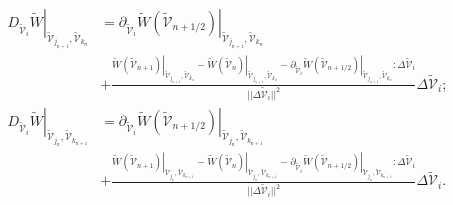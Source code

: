 \begin{equation}\label{eqn:definition of partitioned discrete gradient I}
\begin{aligned}
\left.D_{\widetilde{\mathcal{V}}_i}\widetilde{W}\right\vert_{\widetilde{\mathcal{V}}_{j_{n+1}},\widetilde{\mathcal{V}}_{k_{n}}}&  = \left.\partial_{\widetilde{\mathcal{V}}_i}\widetilde{W}\left(\widetilde{\mathcal{V}}_{n+1/2}\right)\right\vert_{\widetilde{\mathcal{V}}_{j_{n+1}},\widetilde{\mathcal{V}}_{k_{n}}}\\& + 
%
\frac{\left.\widetilde{W}\left(\widetilde{\mathcal{V}}_{n+1}\right)\right\vert_{\widetilde{\mathcal{V}}_{j_{n+1}},\widetilde{\mathcal{V}}_{k_{n}}} - 
	\left.\widetilde{W}\left(\widetilde{\mathcal{V}}_{n}\right)\right\vert_{\widetilde{\mathcal{V}}_{j_{n+1}},\widetilde{\mathcal{V}}_{k_{n}}}
	-\left.\partial_{\widetilde{\mathcal{V}}_i}\widetilde{W}\left(\widetilde{\mathcal{V}}_{n+1/2}\right)\right\vert_{\widetilde{\mathcal{V}}_{j_{n+1}},\widetilde{\mathcal{V}}_{k_{n}}}:\Delta\widetilde{\mathcal{V}}_i}{\vert\vert\Delta\widetilde{\mathcal{V}}_i\vert\vert^2}\Delta\widetilde{\mathcal{V}}_i;\\
%
%
\left.D_{\widetilde{\mathcal{V}}_i}\widetilde{W}\right\vert_{\widetilde{\mathcal{V}}_{j_{n}},\widetilde{\mathcal{V}}_{k_{n+1}}}&  = \left.\partial_{\widetilde{\mathcal{V}}_i}\widetilde{W}\left(\widetilde{\mathcal{V}}_{n+1/2}\right)\right\vert_{\widetilde{\mathcal{V}}_{j_{n}},\widetilde{\mathcal{V}}_{k_{n+1}}}\\& + 
%
\frac{\left.\widetilde{W}\left(\widetilde{\mathcal{V}}_{n+1}\right)\right\vert_{\widetilde{\mathcal{V}}_{j_{n}},\widetilde{\mathcal{V}}_{k_{n+1}}} - 
	\left.\widetilde{W}\left(\widetilde{\mathcal{V}}_{n}\right)\right\vert_{\widetilde{\mathcal{V}}_{j_{n}},\widetilde{\mathcal{V}}_{k_{n+1}}}
	-\left.\partial_{\widetilde{\mathcal{V}}_i}\widetilde{W}\left(\widetilde{\mathcal{V}}_{n+1/2}\right)\right\vert_{\widetilde{\mathcal{V}}_{j_{n}},\widetilde{\mathcal{V}}_{k_{n+1}}}:\Delta\widetilde{\mathcal{V}}_i}{\vert\vert\Delta\widetilde{\mathcal{V}}_i\vert\vert^2}\Delta\widetilde{\mathcal{V}}_i.
\end{aligned}
\end{equation}

